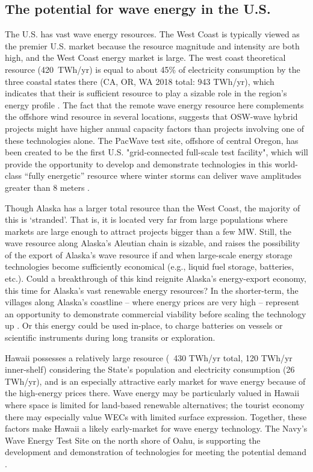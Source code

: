 \subsection{The potential for wave energy in the U.S.}

The U.S. has vast wave energy resources. The West Coast is typically viewed as the premier U.S. market because the resource magnitude and intensity are both high, and the West Coast energy market is large. The west coast theoretical resource (420~TWh/yr) is equal to about 45\% of electricity consumption by the three coastal states there (CA, OR, WA 2018 total: 943 TWh/yr), which indicates that their is sufficient resource to play a sizable role in the region's energy profile \citep{energyinformationadministrationStateEnergyConsumption2020}.  
The fact that the remote wave energy resource here complements the offshore wind resource in several locations, suggests that OSW-wave hybrid projects might have higher annual capacity factors than projects involving one of these technologies alone. The PacWave test site, offshore of central Oregon, has been created to be the first U.S. "grid-connected full-scale test facility", which will provide the opportunity to develop and demonstrate technologies in this world-class ``fully energetic'' resource where winter storms can deliver wave amplitudes greater than 8 meters \citep[e.g.][]{allan_climate_2006}.

Though Alaska has a larger total resource than the West Coast, the majority of this is `stranded'. That is, it is located very far from large populations where markets are large enough to attract projects bigger than a few MW. Still, the wave resource along Alaska's Aleutian chain is sizable, and raises the possibility of the export of Alaska's wave resource if and when large-scale energy storage technologies become sufficiently economical (e.g., liquid fuel storage, batteries, etc.). Could a breakthrough of this kind reignite Alaska's energy-export economy, this time for Alaska's vast renewable energy resources? In the shorter-term, the villages along Alaska's coastline -- where energy prices are very high -- represent an opportunity to demonstrate commercial viability before scaling the technology up \cite{alaskaenergyauthority2019PowerCost2020}. Or this energy could be used in-place, to charge batteries on vessels or scientific instruments during long transits or exploration. 

Hawaii possesses a relatively large resource (~430 TWh/yr total, 120 TWh/yr inner-shelf) considering the State's population and electricity consumption (26 TWh/yr), and is an especially attractive early market for wave energy because of the high-energy prices there. 
Wave energy may be particularly valued in Hawaii where space is limited for land-based renewable alternatives; the tourist economy there may especially value WECs with limited surface expression. Together, these factors make Hawaii a likely early-market for wave energy technology. The Navy's Wave Energy Test Site on the north shore of Oahu, is supporting the development and demonstration of technologies for meeting the potential demand \citep{crossEarlyResearchEfforts2015}.

